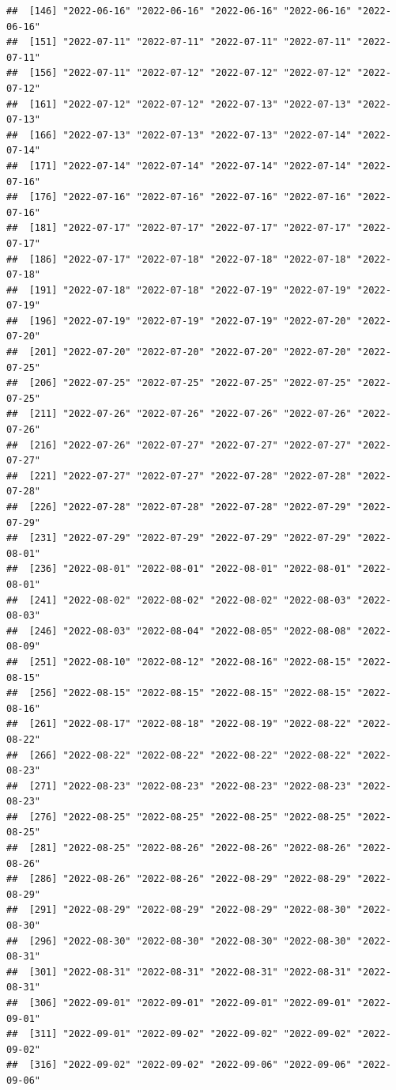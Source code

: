 \documentclass[
]{article}
\begin{document}
\begin{verbatim}
##  [146] "2022-06-16" "2022-06-16" "2022-06-16" "2022-06-16" "2022-06-16"
##  [151] "2022-07-11" "2022-07-11" "2022-07-11" "2022-07-11" "2022-07-11"
##  [156] "2022-07-11" "2022-07-12" "2022-07-12" "2022-07-12" "2022-07-12"
##  [161] "2022-07-12" "2022-07-12" "2022-07-13" "2022-07-13" "2022-07-13"
##  [166] "2022-07-13" "2022-07-13" "2022-07-13" "2022-07-14" "2022-07-14"
##  [171] "2022-07-14" "2022-07-14" "2022-07-14" "2022-07-14" "2022-07-16"
##  [176] "2022-07-16" "2022-07-16" "2022-07-16" "2022-07-16" "2022-07-16"
##  [181] "2022-07-17" "2022-07-17" "2022-07-17" "2022-07-17" "2022-07-17"
##  [186] "2022-07-17" "2022-07-18" "2022-07-18" "2022-07-18" "2022-07-18"
##  [191] "2022-07-18" "2022-07-18" "2022-07-19" "2022-07-19" "2022-07-19"
##  [196] "2022-07-19" "2022-07-19" "2022-07-19" "2022-07-20" "2022-07-20"
##  [201] "2022-07-20" "2022-07-20" "2022-07-20" "2022-07-20" "2022-07-25"
##  [206] "2022-07-25" "2022-07-25" "2022-07-25" "2022-07-25" "2022-07-25"
##  [211] "2022-07-26" "2022-07-26" "2022-07-26" "2022-07-26" "2022-07-26"
##  [216] "2022-07-26" "2022-07-27" "2022-07-27" "2022-07-27" "2022-07-27"
##  [221] "2022-07-27" "2022-07-27" "2022-07-28" "2022-07-28" "2022-07-28"
##  [226] "2022-07-28" "2022-07-28" "2022-07-28" "2022-07-29" "2022-07-29"
##  [231] "2022-07-29" "2022-07-29" "2022-07-29" "2022-07-29" "2022-08-01"
##  [236] "2022-08-01" "2022-08-01" "2022-08-01" "2022-08-01" "2022-08-01"
##  [241] "2022-08-02" "2022-08-02" "2022-08-02" "2022-08-03" "2022-08-03"
##  [246] "2022-08-03" "2022-08-04" "2022-08-05" "2022-08-08" "2022-08-09"
##  [251] "2022-08-10" "2022-08-12" "2022-08-16" "2022-08-15" "2022-08-15"
##  [256] "2022-08-15" "2022-08-15" "2022-08-15" "2022-08-15" "2022-08-16"
##  [261] "2022-08-17" "2022-08-18" "2022-08-19" "2022-08-22" "2022-08-22"
##  [266] "2022-08-22" "2022-08-22" "2022-08-22" "2022-08-22" "2022-08-23"
##  [271] "2022-08-23" "2022-08-23" "2022-08-23" "2022-08-23" "2022-08-23"
##  [276] "2022-08-25" "2022-08-25" "2022-08-25" "2022-08-25" "2022-08-25"
##  [281] "2022-08-25" "2022-08-26" "2022-08-26" "2022-08-26" "2022-08-26"
##  [286] "2022-08-26" "2022-08-26" "2022-08-29" "2022-08-29" "2022-08-29"
##  [291] "2022-08-29" "2022-08-29" "2022-08-29" "2022-08-30" "2022-08-30"
##  [296] "2022-08-30" "2022-08-30" "2022-08-30" "2022-08-30" "2022-08-31"
##  [301] "2022-08-31" "2022-08-31" "2022-08-31" "2022-08-31" "2022-08-31"
##  [306] "2022-09-01" "2022-09-01" "2022-09-01" "2022-09-01" "2022-09-01"
##  [311] "2022-09-01" "2022-09-02" "2022-09-02" "2022-09-02" "2022-09-02"
##  [316] "2022-09-02" "2022-09-02" "2022-09-06" "2022-09-06" "2022-09-06"

\end{verbatim}
\end{document}
